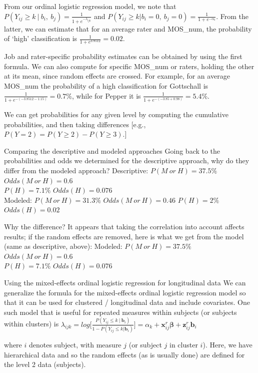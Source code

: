 \documentclass[
  9pt,
  ignorenonframetext,
]{beamer}
\begin{document}
\begin{frame}{}
\protect\hypertarget{section-4}{}
From our ordinal logistic regression model, we note that
\(P(Y_{ij} \geq k\ |\ b_i,\ b_j)=\frac 1 {1+e^{-\lambda_{ijk}}}\) and
\(P(Y_{ij} \geq k|b_i=0,\ b_j=0)=\frac 1 {1+e^{-\alpha_k}}\). From the
latter, we can estimate that for an average rater and MOS\_num, the
probability of `high' classification is
\(\frac 1 {1+e^{3.8512}} = 0.02\).

Job and rater-specific probability estimates can be obtained by using
the first formula. We can also compute for specific MOS\_num or raters,
holding the other at its mean, since random effects are crossed. For
example, for an average MOS\_num the probability of a high
classification for Gottschall is
\(\frac 1 {1+e^{-(-3.8512-1.15)}} = 0.7\%\), while for Pepper it is
\(\frac 1 {1+e^{-(-3.85+0.98)}} = 5.4\%\).

We can get probabilities for any given level by computing the cumulative
probabilities, and then taking differences {[}e.g.,
\(P(Y=2)=P(Y \geq 2) - P(Y \geq 3).\){]}
\end{frame}

\begin{frame}{Comparing the descriptive and modeled approaches}
\protect\hypertarget{comparing-the-descriptive-and-modeled-approaches}{}
Going back to the probabilities and odds we determined for the
descriptive approach, why do they differ from the modeled approach?
Descriptive: \(P(M\ or\ H)=37.5\%\) \(Odds(M\ or\ H)=0.6\)\\
\(P(H) = 7.1\%\) \(Odds(H)=0.076\)\\
Modeled: \(P(M\ or\ H)=31.3\%\) \(Odds(M\ or\ H)=0.46\) \(P(H) = 2\%\)
\(Odds(H)=0.02\)

Why the difference? It appears that taking the correlation into account
affects results; if the random effects are removed, here is what we get
from the model (same as descriptive, above): Modeled:
\(P(M\ or\ H)=37.5\%\) \(Odds(M\ or\ H)=0.6\)\\
\(P(H) = 7.1\%\) \(Odds(H)=0.076\)
\end{frame}

\begin{frame}{Using the mixed-effects ordinal logistic regression for
longitudinal data}
\protect\hypertarget{using-the-mixed-effects-ordinal-logistic-regression-for-longitudinal-data}{}
We can generalize the formula for the mixed-effects ordinal logistic
regression model so that it can be used for clustered / longitudinal
data and include covariates. One such model that is useful for repeated
measures within subjects (or subjects within clusters) is
\(\lambda_{ijk}=log\Big[\frac {P(Y_{ij}\leq k\ |\ \pmb b_i)} {1-P(Y_{ij}\leq k|\pmb b_i)} \Big] = \alpha_k + \pmb x_{ij}^r \pmb \beta+ \pmb z_{ij}^r \pmb b_i\)

where \(i\) denotes subject, with measure \(j\) (or subject \(j\) in
cluster \(i\)). Here, we have hierarchical data and so the random
effects (as is usually done) are defined for the level 2 data
(subjects).
\end{frame}
\end{document}
